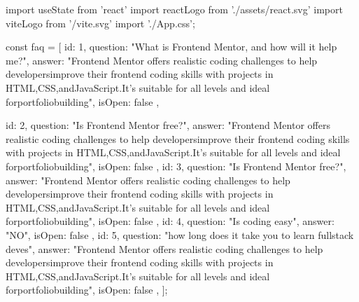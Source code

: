 import { useState } from 'react'
import reactLogo from './assets/react.svg'
import viteLogo from '/vite.svg'
import './App.css';

const faq = [
  {
    id: 1,
    question: "What is Frontend Mentor, and how will it help me?",
    answer:
      "Frontend Mentor offers realistic coding challenges to help developersimprove their frontend coding skills with projects in HTML,CSS,andJavaScript.It's suitable for all levels and ideal forportfoliobuilding",
    isOpen: false
  },

  {
    id: 2,
    question: "Is Frontend Mentor free?",
    answer:
      "Frontend Mentor offers realistic coding challenges to help developersimprove their frontend coding skills with projects in HTML,CSS,andJavaScript.It's suitable for all levels and ideal forportfoliobuilding",
    isOpen: false
  },
  {
    id: 3,
    question: "Is Frontend Mentor free?",
    answer:
      "Frontend Mentor offers realistic coding challenges to help developersimprove their frontend coding skills with projects in HTML,CSS,andJavaScript.It's suitable for all levels and ideal forportfoliobuilding",
    isOpen: false
  },
  {
    id: 4,
    question: "Is coding easy",
    answer: "NO",
    isOpen: false
  },
  {
    id: 5,
    question: "how long does it take you to learn fullstack deves",
    answer:
      "Frontend Mentor offers realistic coding challenges to help developersimprove their frontend coding skills with projects in HTML,CSS,andJavaScript.It's suitable for all levels and ideal forportfoliobuilding",
    isOpen: false
  },
];

